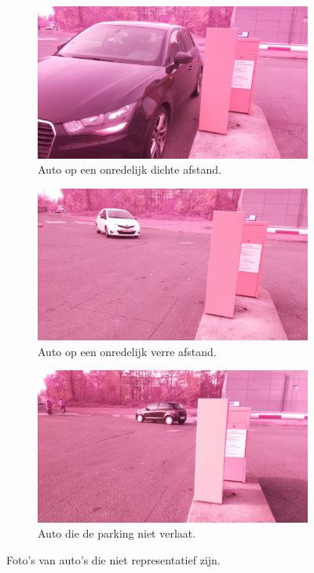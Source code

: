 \begin{figure}[h!]
	\centering
	\begin{subfigure}[b]{0.45\linewidth}
		\includegraphics[width=\linewidth]{img/slecht/close.jpg}
		\caption{Auto op een onredelijk dichte afstand.}
	\end{subfigure}
	\begin{subfigure}[b]{0.45\linewidth}
		\includegraphics[width=\linewidth]{img/slecht/far.jpg}
		\caption{Auto op een onredelijk verre afstand.}
	\end{subfigure}
	\begin{subfigure}[b]{0.45\linewidth}
	\includegraphics[width=\linewidth]{img/slecht/anderekant.jpg}
	\caption{Auto die de parking niet verlaat.}
	\end{subfigure}
	\caption{Foto's van auto's die niet representatief zijn.}
	\label{fig:badpics}
\end{figure}

